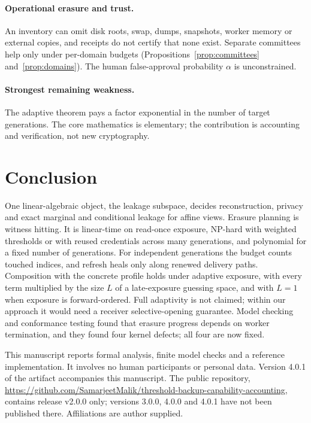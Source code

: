 \documentclass[pdflatex,sn-mathphys-num]{sn-jnl}
\theoremstyle{plain}
\theoremstyle{definition}
\begin{document}
\paragraph{Operational erasure and trust.}
An inventory can omit disk roots, swap, dumps, snapshots, worker memory or external copies, and receipts do not certify that none exist. Separate committees help only under per-domain budgets (Propositions~\ref{prop:committees} and~\ref{prop:domains}). The human false-approval probability $\alpha$ is unconstrained.

\paragraph{Strongest remaining weakness.}
The adaptive theorem pays a factor exponential in the number of target generations. The core mathematics is elementary; the contribution is accounting and verification, not new cryptography.


\section{Conclusion}
One linear-algebraic object, the leakage subspace, decides reconstruction, privacy and exact marginal and conditional leakage for affine views. Erasure planning is witness hitting. It is linear-time on read-once exposure, NP-hard with weighted thresholds or with reused credentials across many generations, and polynomial for a fixed number of generations. For independent generations the budget counts touched indices, and refresh heals only along renewed delivery paths. Composition with the concrete profile holds under adaptive exposure, with every term multiplied by the size $L$ of a late-exposure guessing space, and with $L=1$ when exposure is forward-ordered. Full adaptivity is not claimed; within our approach it would need a receiver selective-opening guarantee. Model checking and conformance testing found that erasure progress depends on worker termination, and they found four kernel defects; all four are now fixed.


\backmatter
{}
This manuscript reports formal analysis, finite model checks and a reference implementation. It involves no human participants or personal data. Version 4.0.1 of the artifact accompanies this manuscript. The public repository, \url{https://github.com/SamarjeetMalik/threshold-backup-capability-accounting}, contains release v2.0.0 only; versions 3.0.0, 4.0.0 and 4.0.1 have not been published there. Affiliations are author supplied.
\end{document}
